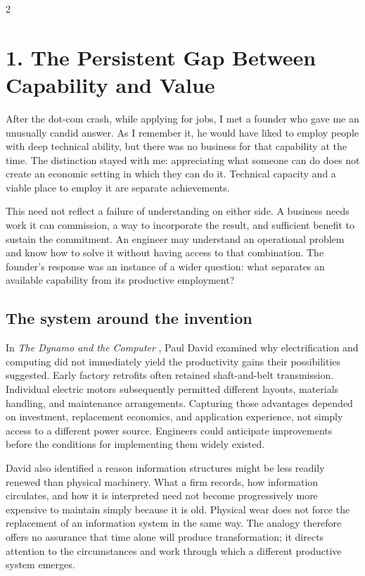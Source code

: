 \clearpage
\begin{multicols}{2}

\section{1. The Persistent Gap Between Capability and
Value}\label{the-persistent-gap-between-capability-and-value}

After the dot-com crash, while applying for jobs, I met a founder who
gave me an unusually candid answer. As I remember it, he would have
liked to employ people with deep technical ability, but there was no
business for that capability at the time. The distinction stayed with
me: appreciating what someone can do does not create an economic setting
in which they can do it. Technical capacity and a viable place to employ
it are separate achievements.

This need not reflect a failure of understanding on either side. A
business needs work it can commission, a way to incorporate the result,
and sufficient benefit to sustain the commitment. An engineer may
understand an operational problem and know how to solve it without
having access to that combination. The founder's response was an
instance of a wider question: what separates an available capability
from its productive employment?

\subsection{The system around the
invention}\label{the-system-around-the-invention}

In \emph{The Dynamo and the Computer} \citep{david1990dynamo}, Paul
David examined why electrification and computing did not immediately
yield the productivity gains their possibilities suggested. Early
factory retrofits often retained shaft-and-belt transmission. Individual
electric motors subsequently permitted different layouts, materials
handling, and maintenance arrangements. Capturing those advantages
depended on investment, replacement economics, and application
experience, not simply access to a different power source. Engineers
could anticipate improvements before the conditions for implementing
them widely existed.

David also identified a reason information structures might be less
readily renewed than physical machinery. What a firm records, how
information circulates, and how it is interpreted need not become
progressively more expensive to maintain simply because it is old.
Physical wear does not force the replacement of an information system in
the same way. The analogy therefore offers no assurance that time alone
will produce transformation; it directs attention to the circumstances
and work through which a different productive system emerges.


\end{multicols}
